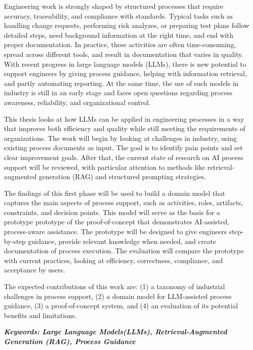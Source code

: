

Engineering work is strongly shaped by structured processes that require accuracy, traceability, and compliance with standards. Typical tasks such as handling change requests, performing risk analyzes, or preparing test plans follow detailed steps, need background information at the right time, and end with proper documentation. In practice, these activities are often time-consuming, spread across different tools, and result in documentation that varies in quality. With recent progress in large language models (LLMs), there is new potential to support engineers by giving process guidance, helping with information retrieval, and partly automating reporting. At the same time, the use of such models in industry is still in an early stage and faces open questions regarding process awareness, reliability, and organizational control.

This thesis looks at how LLMs can be applied in engineering processes in a way that improves both efficiency and quality while still meeting the requirements of organizations. The work will begin by looking at challenges in industry, using existing process documents as input. The goal is to identify pain points and set clear improvement goals. After that, the current state of research on AI process support will be reviewed, with particular attention to methods like retrieval-augmented generation (RAG) and structured prompting strategies.

The findings of this first phase will be used to build a domain model that captures the main aspects of process support, such as activities, roles, artifacts, constraints, and decision points. This model will serve as the basis for a prototype prototype of the proof-of-concept that demonstrates AI-assisted, process-aware assistance. The prototype will be designed to give engineers step-by-step guidance, provide relevant knowledge when needed, and create documentation of process execution. The evaluation will compare the prototype with current practices, looking at efficiency, correctness, compliance, and acceptance by users.

The expected contributions of this work are: (1) a taxonomy of industrial challenges in process support, (2) a domain model for LLM-assisted process guidance, (3) a proof-of-concept system, and (4) an evaluation of its potential benefits and limitations.




\textbf{\textit{Keywords: Large Language Models(LLMs), Retrieval-Augmented Generation (RAG), Process Guidance}} 
